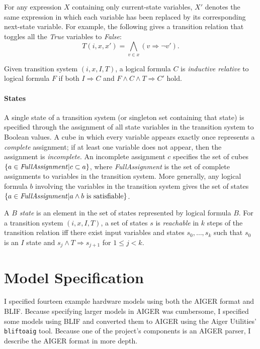 \documentclass[12pt,a4paper,twoside,openright]{report}
\begin{document}
{{For any expression $X$ containing only current-state variables,
$X'$ denotes the same expression in which each variable has been
replaced by its corresponding next-state variable.
For example, the following gives a transition relation that toggles all the
{\it True} variables to {\it False}:
$$T(i,x,x') = \bigwedge_{v \in x} (v \Rightarrow \neg v').$$

Given transition system $(i,x,I,T)$, a logical formula $C$ is
\emph{inductive relative} to logical formula $F$ if both
$I \Rightarrow C$ and $F \wedge C \wedge T \Rightarrow C'$ hold.
}

\paragraph{States}{
A single state of a transition system (or singleton set containing that state)
is specified through the assignment of all state variables in the transition system
to Boolean values.
A cube in which every variable
appears exactly once represents a \emph{complete} assignment;
if at least one variable does not appear, then the assignment
is \emph{incomplete}.
An incomplete
assignment $c$ specifies the set of cubes $\{a \in{\it FullAssignment}|c \subset a\}$,
where {\it FullAssignment} is the set of complete assignments to variables in the
transition system.
More generally, any logical formula $b$ involving the variables in the transition
system gives the set of states
$\{a \in {\it FullAssignment} | a \wedge b~{\rm is~satisfiable}\}$.

A \emph{$B$ state} is an element in the set of states
represented
by logical formula $B$.
For a transition system $(i, x, I, T)$, a
set of states $s$ is \emph{reachable}
in $k$ steps of the transition relation iff there exist input variables and
states $s_0, \ldots, s_k$ such that
$s_0$ is an $I$ state and $s_j \wedge T \Rightarrow s_{j + 1}$ for $1 \leq j < k$.
}


\section{Model Specification}
\label{prep:aiger}


I specified fourteen example hardware models using
both the AIGER format and BLIF.
Because specifying larger models in AIGER was cumbersome,
I specified some models using BLIF and converted them to AIGER
using the Aiger Utilities' \verb,bliftoaig, tool. Because one of
the project's components is an AIGER parser, I describe the AIGER format
in more depth.

}
\end{document}

